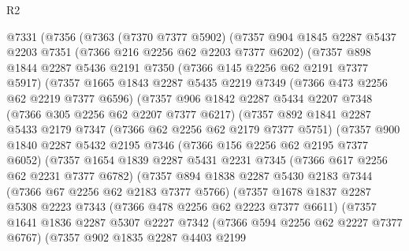 \begin{lexlean}{R2}
\begin{coremodule}
  @7331
    (@7356
      (@7363
        (@7370 @7377 @5902)
        (@7357
          @904
          @1845
          @2287
          @5437
          @2203
          @7351
          (@7366 @216 @2256 @62 @2203 @7377 @6202)
          (@7357
            @898
            @1844
            @2287
            @5436
            @2191
            @7350
            (@7366 @145 @2256 @62 @2191 @7377 @5917)
            (@7357
              @1665
              @1843
              @2287
              @5435
              @2219
              @7349
              (@7366 @473 @2256 @62 @2219 @7377 @6596)
              (@7357
                @906
                @1842
                @2287
                @5434
                @2207
                @7348
                (@7366 @305 @2256 @62 @2207 @7377 @6217)
                (@7357
                  @892
                  @1841
                  @2287
                  @5433
                  @2179
                  @7347
                  (@7366 @62 @2256 @62 @2179 @7377 @5751)
                  (@7357
                    @900
                    @1840
                    @2287
                    @5432
                    @2195
                    @7346
                    (@7366 @156 @2256 @62 @2195 @7377 @6052)
                    (@7357
                      @1654
                      @1839
                      @2287
                      @5431
                      @2231
                      @7345
                      (@7366 @617 @2256 @62 @2231 @7377 @6782)
                      (@7357
                        @894
                        @1838
                        @2287
                        @5430
                        @2183
                        @7344
                        (@7366 @67 @2256 @62 @2183 @7377 @5766)
                        (@7357
                          @1678
                          @1837
                          @2287
                          @5308
                          @2223
                          @7343
                          (@7366 @478 @2256 @62 @2223 @7377 @6611)
                          (@7357
                            @1641
                            @1836
                            @2287
                            @5307
                            @2227
                            @7342
                            (@7366 @594 @2256 @62 @2227 @7377 @6767)
                            (@7357
                              @902
                              @1835
                              @2287
                              @4403
                              @2199

\end{coremodule}
\end{lexlean}
